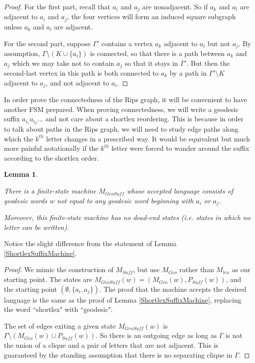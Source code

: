 \documentclass{amsart}
\newtheorem{lemma}[theorem]{Lemma}
\theoremstyle{definition}
\theoremstyle{remark}
\begin{document}
	\begin{proof}
		
		For the first part, recall that $a_i$ and $a_j$ are nonadjacent. So if $a_k$ and $a_l$ are adjacent to $a_i$ and $a_j$, the four vertices will form an induced square subgraph unless $a_k$ and $a_l$ are adjacent.
		
		For the second part, suppose $\Gamma'$ contains a vertex $a_k$ adjacent to $a_i$ but not $a_j$. By assumption, $\Gamma\setminus (K\cup\{a_i\})$ is connected, so that there is a path between $a_k$ and $a_j$ which we may take not to contain $a_j$ so that it stays in $\Gamma'$. But then the second-last vertex in this path is both connected to $a_k$ by a path in $\Gamma'\setminus K$ adjacent to $a_j$, and not adjacent to $a_i$.
	\end{proof}
	
	In order prove the connectedness of the Rips graph, it will be convenient to have another FSM prepared. When proving connectedness, we will write a geodesic suffix  $a_{i_1}a_{i_2}...$ and not care about a shortlex reordering. This is because in order to talk about paths in the Rips graph, we will need to study edge paths along which the $k^{th}$ letter changes in a prescribed way. It would be equivalent but much more painful notationally if the $k^{th}$ letter were forced to wander around the suffix according to the shortlex order.
	
	
	\begin{lemma}\label{GeoSuffMachine}
		
		There is a finite-state machine $M_{GeoSuff}$ whose accepted language consists of geodesic words $w$ not equal to any geodesic word beginning with $a_i$ or $a_j$.
		
		Moreover, this finite-state machine has no dead-end states (i.e. states in which no letter can be written).
		
	\end{lemma}
	
	Notice the slight difference from the statement of Lemma \ref{ShortlexSuffixMachine}.
	
	\begin{proof}
		
		We mimic the construction of $M_{Suff}$, but use $M_{Geo}$ rather than $M_{lex}$ as our starting point. The states are $M_{GeoSuff}(w)=(M_{Geo}(w),P_{Suff}(w))$, and the starting point $(\emptyset, \{a_i, a_j\})$. The proof that the machine accepts the desired language is the same as the proof of Lemma \ref{ShortlexSuffixMachine}, replacing the word ``shortlex" with ``geodesic".
		
		The set of edges exiting a given state $M_{GeoSuff}(w)$ is $\Gamma\setminus (M_{Geo}(w)\cup P_{Suff}(w))$. So there is an outgoing edge as long as $\Gamma$ is not the union of a clique and a pair of letters that are not adjacent. This is guaranteed by the standing assumption that there is no separating clique in $\Gamma$.
	\end{proof}
	
\end{document}
